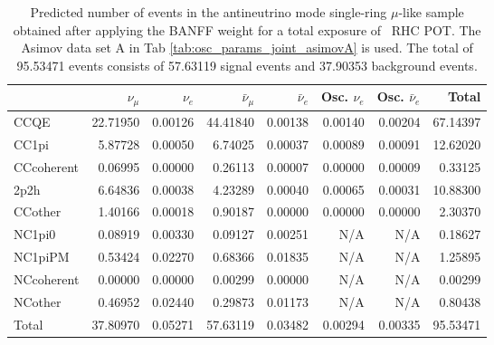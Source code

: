 \begin{table}
	\centering
	\begin{tabular} { | l ||r | r | r | r | r | r | | r | }
	\hline
	              & $\nu_\mu$            & $\nu_e$              & $\bar{\nu}_{\mu}$    & $\bar{\nu}_{e}$      & Osc. $\nu_e$         & Osc. $\bar{\nu}_{e}$ & Total                \\ \hline\hline
	 CCQE         & 22.71950             & 0.00126              & 44.41840             & 0.00138              & 0.00140              & 0.00204              & 67.14397             \\ \hline
	 CC1pi        & 5.87728              & 0.00050              & 6.74025              & 0.00037              & 0.00089              & 0.00091              & 12.62020             \\ \hline
	 CCcoherent   & 0.06995              & 0.00000              & 0.26113              & 0.00007              & 0.00000              & 0.00009              & 0.33125              \\ \hline
	 2p2h         & 6.64836              & 0.00038              & 4.23289              & 0.00040              & 0.00065              & 0.00031              & 10.88300             \\ \hline
	 CCother      & 1.40166              & 0.00018              & 0.90187              & 0.00000              & 0.00000              & 0.00000              & 2.30370              \\ \hline
	 NC1pi0       & 0.08919              & 0.00330              & 0.09127              & 0.00251              & N/A                  & N/A                  & 0.18627              \\ \hline
	 NC1piPM      & 0.53424              & 0.02270              & 0.68366              & 0.01835              & N/A                  & N/A                  & 1.25895              \\ \hline
	 NCcoherent   & 0.00000              & 0.00000              & 0.00299              & 0.00000              & N/A                  & N/A                  & 0.00299              \\ \hline
	 NCother      & 0.46952              & 0.02440              & 0.29873              & 0.01173              & N/A                  & N/A                  & 0.80438              \\ \hline
	\hline
	 Total        & 37.80970             & 0.05271              & 57.63119             & 0.03482              & 0.00294              & 0.00335              & 95.53471             \\ \hline
	\end{tabular}
	\caption{Predicted number of events in the antineutrino mode single-ring $\mu$-like sample obtained after applying the BANFF weight for a total exposure of \TotalPotNuBarRunOneNineC\ RHC POT. The Asimov data set A in Tab \ref{tab:osc_params_joint_asimovA} is used. The total of 95.53471 events consists of 57.63119 signal events and 37.90353 background events.}
	\label{tab:event_rates_exp_RHC1Rmu}
\end{table}

